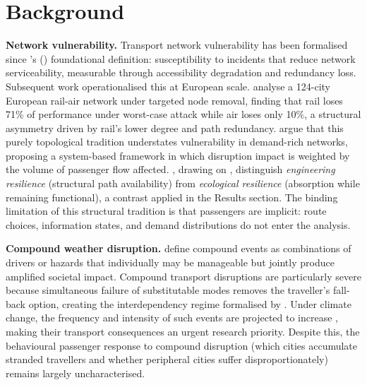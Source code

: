 \documentclass[12pt,a4paper]{article}
\begin{document}
\section{Background}
\label{sec:background}

\textbf{Network vulnerability.}
Transport network vulnerability has been formalised since \citeauthor{Berdica2002}'s
(\citeyear{Berdica2002}) foundational definition: susceptibility to incidents that reduce
network serviceability, measurable through accessibility degradation and redundancy loss.
Subsequent work operationalised this at European scale.
\citet{Ippolito2024} analyse a 124-city European rail-air network under targeted node
removal, finding that rail loses 71\% of performance under worst-case attack while air
loses only 10\%, a structural asymmetry driven by rail's lower degree and path redundancy.
\citet{Mattsson2015} argue that this purely topological tradition understates vulnerability
in demand-rich networks, proposing a system-based framework in which disruption impact is
weighted by the volume of passenger flow affected.
\citet{Reggiani2015}, drawing on \citet{Holling1973}, distinguish \emph{engineering resilience}
(structural path availability) from \emph{ecological resilience} (absorption while remaining functional),
a contrast applied in the Results section.
The binding limitation of this structural tradition is that passengers are implicit:
route choices, information states, and demand distributions do not enter the analysis.

\textbf{Compound weather disruption.}
\citet{Zscheischler2020} define compound events as combinations of drivers or hazards that
individually may be manageable but jointly produce amplified societal impact.
Compound transport disruptions are particularly severe because simultaneous failure of
substitutable modes removes the traveller's fall-back option,
creating the interdependency regime formalised by \citet{Buldyrev2010}.
Under climate change, the frequency and intensity of such events are projected to increase
\citep{IPCC2023}, making their transport consequences an urgent research priority.
Despite this, the behavioural passenger response to compound disruption (which cities accumulate
stranded travellers and whether peripheral cities suffer disproportionately) remains largely uncharacterised.
\end{document}
